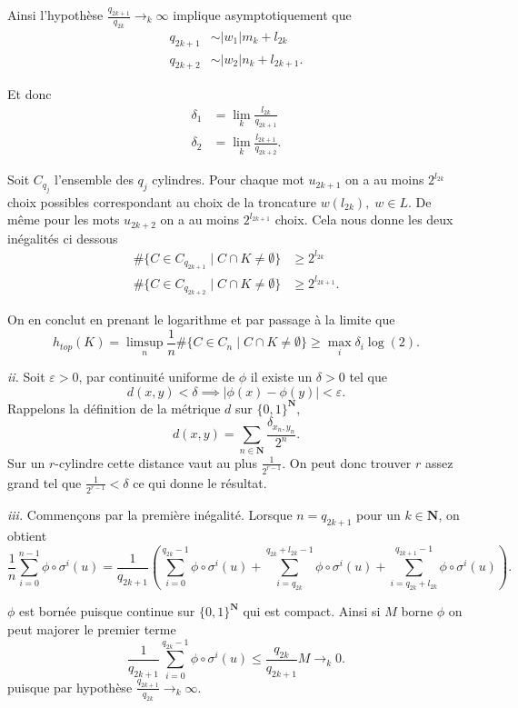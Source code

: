 \documentclass[12pt]{article}
\newcommand{\N}{\mathbf{N}}
\begin{document}
Ainsi l'hypothèse $\frac{q_{2k+1}}{q_{2k}} \to_{k} \infty$ implique asymptotiquement que
\begin{align*}
        q_{2k+1} &\sim |w_{1}|m_{k}+l_{2k} \\
        q_{2k+2} &\sim |w_{2}|n_{k}+l_{2k+1}
.\end{align*}

Et donc
\begin{align*}
        \delta_{1} &= \lim_{k} \frac{l_{2k}}{q_{2k+1}} \\
        \delta_{2} &= \lim_{k} \frac{l_{2k+1}}{q_{2k+2}}
.\end{align*}

Soit $C_{q_{j}}$ l'ensemble des $q_{j}$ cylindres. Pour chaque mot $u_{2k+1}$ on a au moins $2^{l_{2k}}$ choix possibles correspondant au choix de la troncature $w(l_{2k}), \; w \in L$. De même pour les mots $u_{2k+2}$ on a au moins $2^{l_{2k+1}}$ choix. Cela nous donne les deux inégalités ci dessous
\begin{align*}
        \#\{C \in C_{q_{2k+1}} \;|\; C \cap K \neq \emptyset\} &\ge 2^{l_{2k}} \\
        \#\{C \in C_{q_{2k+2}} \;|\; C \cap K \neq \emptyset\} &\ge 2^{l_{2k+1}}
.\end{align*}

On en conclut en prenant le logarithme et par passage à la limite que \[
        h_{top}(K) = \limsup_{n}\frac{1}{n}\#\{C\in C_{n} \;|\; C \cap K \neq \emptyset\} \ge \max_{i}\delta_{i}\log(2)
.\] 

\medskip

\textit{ii.} Soit $\varepsilon > 0$, par continuité uniforme de $\phi$ il existe un $\delta > 0$ tel que  \[
        d(x,y) < \delta \implies |\phi(x)-\phi(y)| < \varepsilon
.\]  Rappelons la définition de la métrique $d$ sur $\{0,1\}^{\N}$, \[
d(x,y) = \sum_{n\in\N} \frac{\delta_{x_{n},y_{n}}}{2^{n}}
.\] Sur un $r$-cylindre cette distance vaut au plus $\frac{1}{2^{r-1}}$. On peut donc trouver $r$ assez grand tel que $\frac{1}{2^{r-1}} < \delta$ ce qui donne le résultat.

\medskip

\textit{iii.}  Commençons par la première inégalité. Lorsque $n = q_{2k+1}$ pour un $k\in\N$, on obtient \[
        \frac{1}{n}\sum_{i=0}^{n-1} \phi\circ\sigma^{i}(u) = \frac{1}{q_{2k+1}}(\sum_{i=0}^{q_{2k}-1} \phi\circ\sigma^{i}(u) + \sum_{i=q_{2k}}^{q_{2k}+l_{2k}-1} \phi\circ\sigma^{i}(u) + \sum_{i=q_{2k}+l_{2k}}^{q_{2k+1}-1} \phi\circ\sigma^{i}(u))
.\] 

$\phi$ est bornée puisque continue sur $\{0,1\}^{\N}$ qui est compact. Ainsi si $M$ borne $\phi$ on peut majorer le premier terme  \[
        \frac{1}{q_{2k+1}}\sum_{i=0}^{q_{2k}-1} \phi\circ\sigma^{i}(u) \le \frac{q_{2k}}{q_{2k+1}}M \to_{k} 0
.\] puisque par hypothèse $\frac{q_{2k+1}}{q_{2k}} \to_{k} \infty$.
\end{document}
